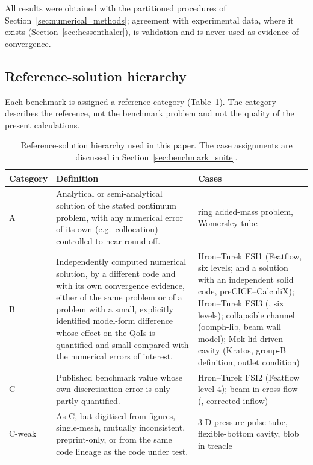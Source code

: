 All results were obtained with the partitioned procedures of Section~\ref{sec:numerical_methods}; agreement with experimental data, where it exists (Section~\ref{sec:hessenthaler}), is validation and is never used as evidence of convergence.

\subsection{Reference-solution hierarchy}\label{sec:ref_hierarchy}

Each benchmark is assigned a reference category (Table~\ref{tab:ref_hierarchy}).
The category describes the reference, not the benchmark problem and not the quality of the present calculations.

\begin{table}[htbp]
	\centering
	\small
	\setlength{\tabcolsep}{4pt}
	\caption{Reference-solution hierarchy used in this paper. The case assignments are discussed in Section~\ref{sec:benchmark_suite}.}
	\label{tab:ref_hierarchy}
	\begin{tabular}{p{1.4cm}p{7.0cm}p{5.0cm}}
		\toprule
		Category & Definition & Cases \\
		\midrule
		A & Analytical or semi-analytical solution of the stated continuum problem, with any numerical error of its own (e.g.\ collocation) controlled to near round-off. & ring added-mass problem, Womersley tube \\
		B & Independently computed numerical solution, by a different code and with its own convergence evidence, either of the same problem or of a problem with a small, explicitly identified model-form difference whose effect on the QoIs is quantified and small compared with the numerical errors of interest. & Hron--Turek FSI1 (Featflow, six levels; and a solution with an independent solid code, preCICE--CalculiX); Hron--Turek FSI3 (\citet{Failer2020}, six levels); collapsible channel (oomph-lib, beam wall model); Mok lid-driven cavity (Kratos, group-B definition, outlet condition) \\
		C & Published benchmark value whose own discretisation error is only partly quantified. & Hron--Turek FSI2 (Featflow level 4); beam in cross-flow (\citet{Richter2012}, corrected inflow) \\
		C-weak & As C, but digitised from figures, single-mesh, mutually inconsistent, preprint-only, or from the same code lineage as the code under test. & 3-D pressure-pulse tube, flexible-bottom cavity, blob in treacle \\
		\bottomrule
	\end{tabular}
\end{table}


